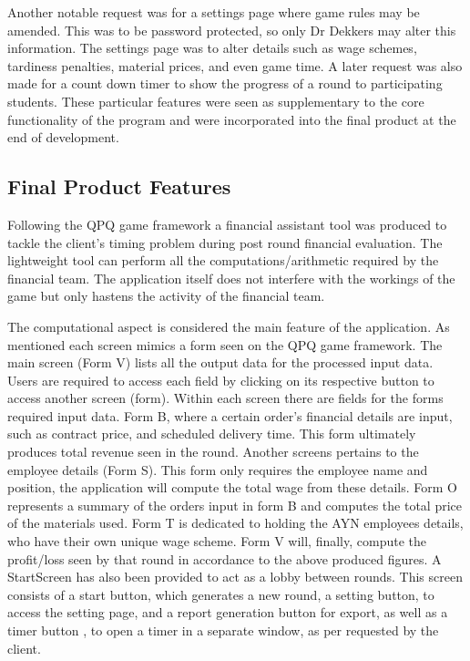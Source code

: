 \documentclass{l3proj}
\begin{document}
Another notable request was for a settings page where game rules may be amended. This was to be password protected, so only Dr Dekkers may alter this information. The settings page was to alter details such as wage schemes, tardiness penalties, material prices, and even game time. A later request was also made for a count down timer to show the progress of a round to participating students.  These particular features were seen as supplementary to the core functionality of the program  and were incorporated into the final product at  the end of development.

\subsection{Final Product Features}
Following the QPQ game framework a financial assistant tool was produced to tackle the client's timing problem during post round financial evaluation. The lightweight tool can perform all the computations/arithmetic required by the financial team. The application itself does not interfere with the workings of the game but only hastens the activity of the financial team.

The computational aspect is considered the main feature of the application. As mentioned each screen mimics a form seen on the QPQ game framework. The main screen (Form V) lists all the output data for the processed input data. Users are required to access each field by clicking on its respective button to access another screen (form). Within each screen there are fields for the forms required input data. Form B, where a certain order’s financial details are input, such as contract price, and scheduled delivery time. This form ultimately produces total revenue seen in the round. Another screens pertains to the employee details (Form S). This form only requires the employee name and position, the application will compute the total wage from these details. Form O represents a summary of the orders input in form B and computes the total price of the materials used. Form T is dedicated to holding the AYN employees details, who have their own unique wage scheme. Form V will, finally,  compute the profit/loss seen by that round in accordance to the above produced figures. A StartScreen has also been provided to act as a lobby between rounds. This screen consists of a start button, which generates a new round, a setting button, to access the setting page, and a report generation button for export, as well as a timer button , to open a timer in a separate window, as per requested by the client.
\end{document}

